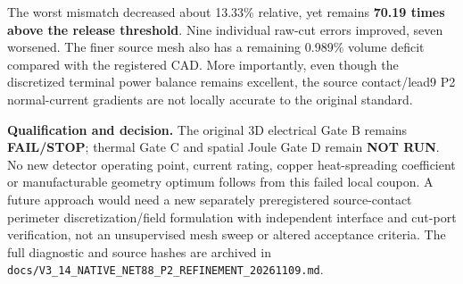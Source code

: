 \clearpage
\clearpage
The worst mismatch decreased about 13.33\% relative, yet remains \textbf{70.19 times above the release threshold}. Nine individual raw-cut errors improved, seven worsened. The finer source mesh also has a remaining 0.989\% volume deficit compared with the registered CAD. More importantly, even though the discretized terminal power balance remains excellent, the source contact/lead9 P2 normal-current gradients are not locally accurate to the original standard.

\textbf{Qualification and decision.} The original 3D electrical Gate B remains \textbf{FAIL/STOP}; thermal Gate C and spatial Joule Gate D remain \textbf{NOT RUN}. No new detector operating point, current rating, copper heat-spreading coefficient or manufacturable geometry optimum follows from this failed local coupon. A future approach would need a new separately preregistered source-contact perimeter discretization/field formulation with independent interface and cut-port verification, not an unsupervised mesh sweep or altered acceptance criteria. The full diagnostic and source hashes are archived in \texttt{docs/V3\_14\_NATIVE\_NET88\_P2\_REFINEMENT\_20261109.md}.
